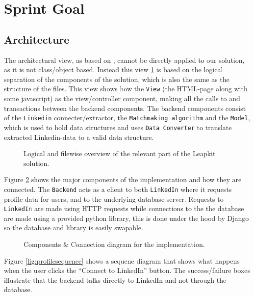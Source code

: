 \section{Sprint Goal}


\subsection{Architecture}

The architectural view, as based on \cite{christensen20123+}, cannot be directly applied to our solution, as it is not class/object based. Instead this view \ref{fig:overview} is based on the logical separation of the components of the solution, which is also the same as the structure of the files. This view shows how the \texttt{View} (the HTML-page along with some javascript) as the view/controller component, making all the calls to and transactions between the backend components. The backend components consist of the \texttt{Linkedin} connecter/extractor, the \texttt{Matchmaking algorithm} and the \texttt{Model}, which is used to hold data structures and uses \texttt{Data Converter} to translate extracted Linkedin-data to a valid data structure.

\begin{figure}[ht]
    \centering
    \scalebox{1}{}
    \caption{Logical and filewise overview of the relevant part of the Leapkit solution.}
    \label{fig:overview}
\end{figure}

Figure \ref{fig:ccdiagram} shows the major components of the implementation and how they are connected. The \texttt{Backend} acts as a client to both \texttt{LinkedIn} where it requests profile data for users, and to the underlying database server. Requests to \texttt{LinkedIn} are made using HTTP requests while connections to the the database are made using a provided python library, this is done under the hood by Django so the database and library is easily swapable.

\begin{figure}[ht]
    \centering
    \scalebox{1}{}
    \caption{Components \& Connection diagram for the implementation.}
    \label{fig:ccdiagram}
\end{figure}

Figure \ref{fig:profilesequence} shows a sequene diagram that shows what happens when the user clicks the ``Connect to LinkedIn'' button. The success/failure boxes illustrate that the backend talks directly to LinkedIn and not through the database.

